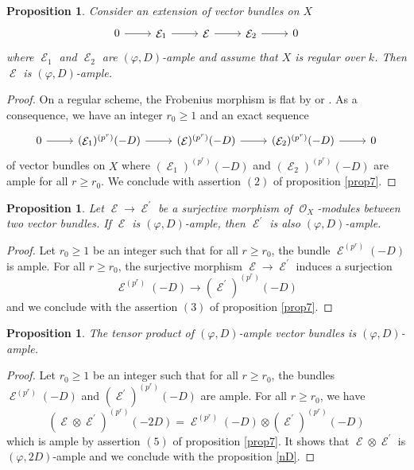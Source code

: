 \documentclass[11pt]{amsart}
\numberwithin{subsection}{section}
\numberwithin{figure}{section}
\numberwithin{table}{section}
\theoremstyle{1}
\newtheorem{proposition}[theorem]{Proposition}
\theoremstyle{2}
\DeclareMathOperator{\E}{\mathcal{E}}
\DeclareMathOperator{\Oc}{\mathcal{O}}
\begin{document}
\begin{proposition}\label{prop19}
Consider an extension of vector bundles on $X$
\begin{equation*}
\begin{tikzcd}
0 \arrow[r] & \E_1 \arrow[r] & \E \arrow[r] & \E_2 \arrow[r] & 0
\end{tikzcd}
\end{equation*}
where $\E_1$ and $\E_2$ are $(\varphi,D)$-ample and assume that $X$ is regular over $k$. Then $\E$ is $(\varphi,D)$-ample.
\end{proposition}
\begin{proof}
On a regular scheme, the Frobenius morphism is flat by \cite{MR252389} or \cite[\href{https://stacks.math.columbia.edu/tag/0EC0}{Lemma 0EC0}]{stacks-project}. As a consequence, we have an integer $r_0\geq 1$ and an exact sequence
\begin{equation*}
\begin{tikzcd}
0 \arrow[r] & (\E_1)^{(p^r)}(-D) \arrow[r] & (\E)^{(p^r)}(-D) \arrow[r] &(\E_2)^{(p^r)}(-D)\arrow[r] & 0
\end{tikzcd}
\end{equation*}
of vector bundles on $X$ where $ (\E_1)^{(p^r)}(-D) $ and $(\E_2)^{(p^r)}(-D)$ are ample for all $r \geq r_0$. We conclude with assertion $(2)$ of proposition \ref{prop7}.
\end{proof}
\begin{proposition}\label{prop16}
Let $\E \rightarrow \E^\prime$ be a surjective morphism of $\Oc_X$-modules between two vector bundles. If $\E$ is $(\varphi,D)$-ample, then $\E^\prime$ is also $(\varphi,D)$-ample.
\end{proposition}
\begin{proof}
Let $r_0 \geq 1$ be an integer such that for all $r \geq r_0$, the bundle $\E^{(p^r)}(-D)$ is ample. For all $r\geq r_0$, the surjective morphism $\E \rightarrow \E^\prime$ induces a surjection
\begin{equation*}
\E^{(p^r)}(-D) \rightarrow {(\E^\prime)}^{(p^r)}(-D)
\end{equation*}
and we conclude with the assertion $(3)$ of proposition \ref{prop7}.
\end{proof}
\begin{proposition}\label{prop17}
The tensor product of $(\varphi,D)$-ample vector bundles is $(\varphi,D)$-ample.
\end{proposition}
\begin{proof}
Let $r_0 \geq 1$ be an integer such that for all $r \geq r_0$, the bundles $\E^{(p^r)}(-D)$ and ${(\E^\prime)}^{(p^r)}(-D)$ are ample. For all $r\geq r_0$, we have
\begin{equation*}
(\E \otimes \E^{\prime})^{(p^r)}(-2D) = \E^{(p^r)}(-D) \otimes {(\E^\prime)}^{(p^r)}(-D)
\end{equation*}
which is ample by assertion $(5)$ of proposition \ref{prop7}. It shows that $\E\otimes\E^{\prime}$ is $(\varphi,2D)$-ample and we conclude with the proposition \ref{nD}.
\end{proof}
\end{document}
